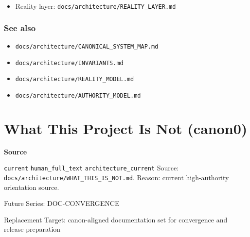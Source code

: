 \documentclass[9pt,a4paper,openany]{book}
\newcommand{\vonecallout}[3]{\par\medskip\noindent\begingroup\setlength{\fboxsep}{7pt}\colorbox{DomCalloutBg}{\parbox{0.94\linewidth}{\textbf{\textcolor{#1}{#2}}\par #3}}\endgroup\par\medskip}
\begin{document}
\begin{itemize}
\item Reality layer: \texttt{docs/\allowbreak{}architecture/\allowbreak{}REALITY\_\allowbreak{}LAYER.\allowbreak{}md}
\end{itemize}





\subsubsection{See also}


\begin{itemize}
\item \texttt{docs/\allowbreak{}architecture/\allowbreak{}CANONICAL\_\allowbreak{}SYSTEM\_\allowbreak{}MAP.\allowbreak{}md}
\end{itemize}


\begin{itemize}
\item \texttt{docs/\allowbreak{}architecture/\allowbreak{}INVARIANTS.\allowbreak{}md}
\end{itemize}


\begin{itemize}
\item \texttt{docs/\allowbreak{}architecture/\allowbreak{}REALITY\_\allowbreak{}MODEL.\allowbreak{}md}
\end{itemize}


\begin{itemize}
\item \texttt{docs/\allowbreak{}architecture/\allowbreak{}AUTHORITY\_\allowbreak{}MODEL.\allowbreak{}md}
\end{itemize}



\section{What This Project Is Not (canon0)}

\vonecallout{DomSlate}{Source}{\texttt{current} \texttt{human\_\allowbreak{}full\_\allowbreak{}text} \texttt{architecture\_\allowbreak{}current} Source: \texttt{docs/\allowbreak{}architecture/\allowbreak{}WHAT\_\allowbreak{}THIS\_\allowbreak{}IS\_\allowbreak{}NOT.\allowbreak{}md}.\allowbreak{} Reason: current high-\allowbreak{}authority orientation source.\allowbreak{}}

Future Series: DOC-\allowbreak{}CONVERGENCE

Replacement Target: canon-\allowbreak{}aligned documentation set for convergence and release preparation
\end{document}
